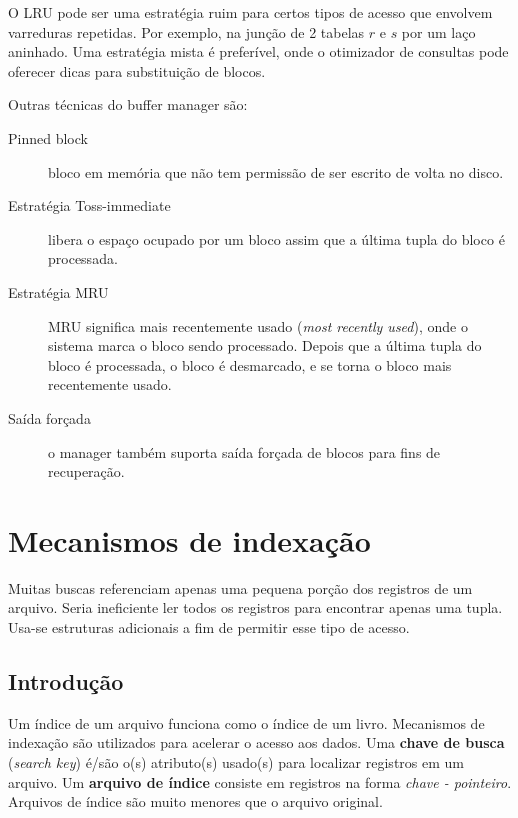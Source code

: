 O LRU pode ser uma estratégia ruim para certos tipos de acesso que envolvem varreduras repetidas.
Por exemplo, na junção de 2 tabelas $r$ e $s$ por um laço aninhado. 
Uma estratégia mista é preferível, onde o otimizador de consultas pode oferecer dicas
para substituição de blocos.

Outras técnicas do buffer manager são:
\begin{description}
\item[Pinned block] bloco em memória que não tem permissão de ser escrito
de volta no disco.

\item[Estratégia Toss-immediate]  libera o espaço ocupado por um bloco assim que 
a última tupla do bloco é processada.

\item[Estratégia MRU] MRU significa mais recentemente usado (\emph{most recently used}), onde 
o sistema marca o bloco sendo processado. Depois que a última tupla do bloco é processada,
o bloco é desmarcado, e se torna o bloco mais recentemente usado.

\item[Saída forçada] o manager também suporta saída forçada de blocos para fins de 
recuperação.
\end{description}

\section{Mecanismos de indexação}

Muitas buscas referenciam apenas uma pequena porção dos registros de um arquivo.
Seria ineficiente ler todos os registros para encontrar apenas uma tupla.
Usa-se estruturas adicionais a fim de permitir esse tipo de acesso.

\subsection{Introdução}

Um índice de um arquivo funciona como o índice de um livro.
Mecanismos de indexação são utilizados para acelerar o acesso
aos dados.
Uma \textbf{chave de busca} (\emph{search key}) é/são o(s) atributo(s) usado(s)
para localizar registros em um arquivo.
Um \textbf{arquivo de índice} consiste em registros na forma \emph{chave -
pointeiro}.
Arquivos de índice são muito menores que o arquivo original.

